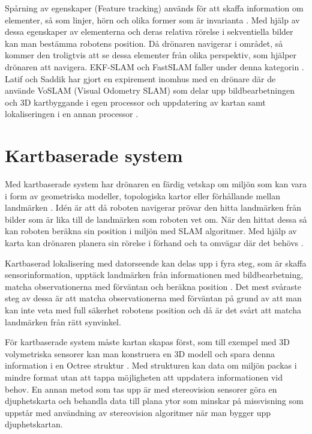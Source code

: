 Spårning av egenskaper (Feature tracking) används för att skaffa information om elementer, så som linjer, hörn och olika former som är invarianta \citep{geospatial}. Med hjälp av dessa egenskaper av elementerna och deras relativa rörelse i sekventiella bilder kan man bestämma robotens position. Då drönaren navigerar i området, så kommer den troligtvis att se dessa elementer från olika perspektiv, som hjälper drönaren att navigera. EKF-SLAM och FastSLAM faller under denna kategorin \cite{8930783}. Latif och Saddik har gjort en expirement inomhus med en drönare där de använde VoSLAM (Visual Odometry SLAM) som delar upp bildbearbetningen och 3D kartbyggande i egen processor och uppdatering av kartan samt lokaliseringen i en annan processor \citep{8930783}.

\section{Kartbaserade system}

Med kartbaserade system har drönaren en färdig vetskap om miljön som kan vara i form av geometriska modeller, topologiska kartor eller förhållande mellan landmärken \citep{982903}. Idén är att då roboten navigerar prövar den hitta landmärken från bilder som är lika till de landmärken som roboten vet om. När den hittat dessa så kan roboten beräkna sin position i miljön med SLAM algoritmer. Med hjälp av karta kan drönaren planera sin rörelse i förhand och ta omvägar där det behövs \citep{geospatial}. 

Kartbaserad lokalisering med datorseende kan delas upp i fyra steg, som är skaffa sensorinformation, upptäck landmärken från informationen med bildbearbetning, matcha observationerna med förväntan och beräkna position \citep{982903}. Det mest svåraste steg av dessa är att matcha observationerna med förväntan på grund av att man kan inte veta med full säkerhet robotens position och då är det svårt att matcha landmärken från rätt synvinkel.

För kartbaserade system måste kartan skapas först, som till exempel med 3D volymetriska sensorer kan man konstruera en 3D modell och spara denna information i en Octree struktur \citep{geospatial}. Med strukturen kan data om miljön packas i mindre format utan att tappa möjligheten att uppdatera informationen vid behov. En annan metod som tas upp är med stereovision sensorer göra en djuphetskarta och behandla data till plana ytor som minskar på missvisning som uppstår med användning av stereovision algoritmer när man bygger upp djuphetskartan.

